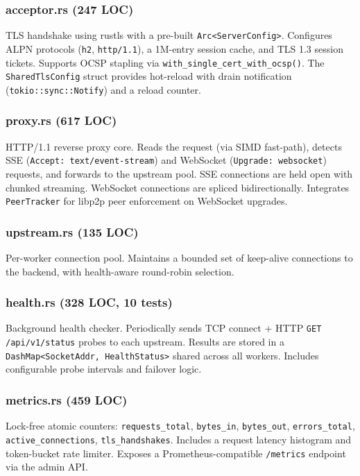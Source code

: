 \documentclass[a4paper, 11pt]{article}
\begin{document}
\subsubsection{acceptor.rs (247 LOC)}

TLS handshake using rustls with a pre-built \texttt{Arc<ServerConfig>}.
Configures ALPN protocols (\texttt{h2}, \texttt{http/1.1}), a 1M-entry
session cache, and TLS 1.3 session tickets.  Supports OCSP stapling
via \texttt{with\_single\_cert\_with\_ocsp()}.  The \texttt{SharedTlsConfig}
struct provides hot-reload with drain notification
(\texttt{tokio::sync::Notify}) and a reload counter.

\subsubsection{proxy.rs (617 LOC)}

HTTP/1.1 reverse proxy core.  Reads the request (via SIMD fast-path),
detects SSE (\texttt{Accept: text/event-stream}) and WebSocket
(\texttt{Upgrade: websocket}) requests, and forwards to the upstream
pool.  SSE connections are held open with chunked streaming.  WebSocket
connections are spliced bidirectionally.  Integrates \texttt{PeerTracker}
for libp2p peer enforcement on WebSocket upgrades.

\subsubsection{upstream.rs (135 LOC)}

Per-worker connection pool.  Maintains a bounded set of keep-alive
connections to the backend, with health-aware round-robin selection.

\subsubsection{health.rs (328 LOC, 10 tests)}

Background health checker.  Periodically sends TCP connect + HTTP
\texttt{GET /api/v1/status} probes to each upstream.  Results are
stored in a \texttt{DashMap<SocketAddr, HealthStatus>} shared across
all workers.  Includes configurable probe intervals and failover logic.

\subsubsection{metrics.rs (459 LOC)}

Lock-free atomic counters: \texttt{requests\_total},
\texttt{bytes\_in}, \texttt{bytes\_out}, \texttt{errors\_total},
\texttt{active\_connections}, \texttt{tls\_handshakes}.
Includes a request latency histogram and token-bucket rate limiter.
Exposes a Prometheus-compatible \texttt{/metrics} endpoint via
the admin API.
\end{document}
